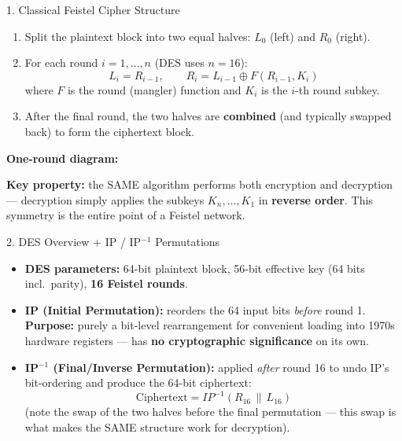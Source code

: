 \documentclass[12pt,a4paper]{article}
\begin{document}
\begin{algobox}{1. Classical Feistel Cipher Structure}
\begin{enumerate}[noitemsep]
  \item Split the plaintext block into two equal halves: $L_0$ (left) and $R_0$ (right).
  \item For each round $i = 1, \dots, n$ (DES uses $n=16$):
  \[
  L_i = R_{i-1}, \qquad R_i = L_{i-1} \oplus F(R_{i-1}, K_i)
  \]
  where $F$ is the round (mangler) function and $K_i$ is the $i$-th round subkey.
  \item After the final round, the two halves are \textbf{combined} (and typically swapped back) to form the ciphertext block.
\end{enumerate}

\textbf{One-round diagram:}
\begin{center}
\end{center}

\textbf{Key property:} the SAME algorithm performs both encryption and decryption --- decryption simply applies the subkeys $K_n, \dots, K_1$ in \textbf{reverse order}. This symmetry is the entire point of a Feistel network.
\end{algobox}

\begin{algobox}{2. DES Overview + IP / IP$^{-1}$ Permutations}
\begin{itemize}[noitemsep]
  \item \textbf{DES parameters:} 64-bit plaintext block, 56-bit effective key (64 bits incl.\ parity), \textbf{16 Feistel rounds}.
  \item \textbf{IP (Initial Permutation):} reorders the 64 input bits \emph{before} round 1. \textbf{Purpose:} purely a bit-level rearrangement for convenient loading into 1970s hardware registers --- has \textbf{no cryptographic significance} on its own.
  \item \textbf{IP$^{-1}$ (Final/Inverse Permutation):} applied \emph{after} round 16 to undo IP's bit-ordering and produce the 64-bit ciphertext:
  \[
  \text{Ciphertext} = IP^{-1}(R_{16} \,\|\, L_{16})
  \]
  (note the swap of the two halves before the final permutation --- this swap is what makes the SAME structure work for decryption).
\end{itemize}
\end{algobox}
\end{document}
